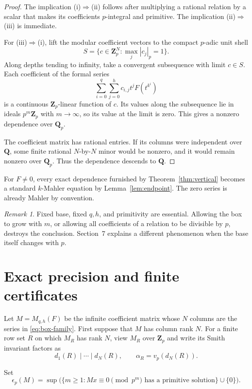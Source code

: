 \documentclass[11pt,reqno]{amsart}
\theoremstyle{definition}
\theoremstyle{remark}
\newtheorem{remark}[theorem]{Remark}
\newcommand{\Q}{\mathbf Q}
\newcommand{\Zp}{\mathbf Z_p}
\newcommand{\Qp}{\mathbf Q_p}
\begin{document}
\begin{proof}
The implication (i)$\Rightarrow$(ii) follows after multiplying a rational
relation by a scalar that makes its coefficients $p$-integral and primitive.
The implication (ii)$\Rightarrow$(iii) is immediate.

For (iii)$\Rightarrow$(i), lift the modular coefficient vectors to the
compact $p$-adic unit shell
\[
 S=\{c\in\Zp^N:\max_j|c_j|_p=1\}.
\]
Along depths tending to infinity, take a convergent subsequence with limit
$c\in S$.  Each coefficient of the formal series
\[
 \sum_{i=0}^{q}\sum_{j=0}^{h}c_{i,j}t^jF(t^{k^i})
\]
is a continuous $\Zp$-linear function of $c$.  Its values along the
subsequence lie in ideals $p^m\Zp$ with $m\to\infty$, so its value at the
limit is zero.  This gives a nonzero dependence over $\Qp$.

The coefficient matrix has rational entries.  If its columns were independent
over $\Q$, some finite rational $N$-by-$N$ minor would be nonzero, and it
would remain nonzero over $\Qp$.  Thus the dependence descends to $\Q$.
\end{proof}

For $F\ne0$, every exact dependence furnished by
Theorem~\ref{thm:vertical} becomes a standard $k$-Mahler equation by
Lemma~\ref{lem:endpoint}.  The zero series is already Mahler by convention.

\begin{remark}\label{rem:uniformity}
Fixed base, fixed $q,h$, and primitivity are essential.  Allowing the box to
grow with $m$, or allowing all coefficients of a relation to be divisible by
$p$, destroys the conclusion.  Section~7 explains a different phenomenon
when the base itself changes with $p$.
\end{remark}

\section{Exact precision and finite certificates}

Let $M=M_{q,h}(F)$ be the infinite coefficient matrix whose $N$ columns are
the series in \eqref{eq:box-family}.  First suppose that $M$ has column rank
$N$.  For a finite row set $R$ on which $M_R$ has rank $N$, view $M_R$ over
$\Zp$ and write its Smith invariant factors as
\[
 d_1(R)\mid\cdots\mid d_N(R),\qquad
 \alpha_R=v_p(d_N(R)).
\]

Set
\begin{equation}\label{eq:local-depth-definition}
 \epsilon_p(M)=\sup\bigl(\{m\geq1:Mx\equiv0\pmod{p^m}
 \text{ has a primitive solution}\}\cup\{0\}\bigr).
\end{equation}
\end{document}
